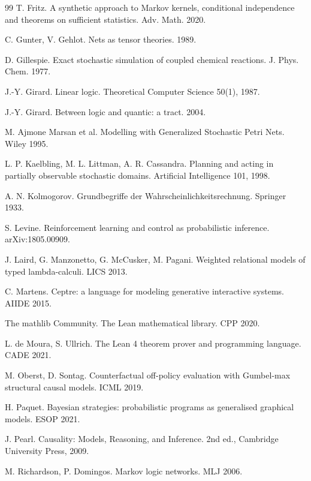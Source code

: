 \documentclass[11pt]{article}
\theoremstyle{plain}
\theoremstyle{definition}
\theoremstyle{remark}
\begin{document}
\begin{thebibliography}{99}
 T. Fritz. A synthetic approach to Markov
kernels, conditional independence and theorems on sufficient
statistics. Adv. Math. 2020.

 C. Gunter, V. Gehlot. Nets as tensor theories.
1989.

 D. Gillespie. Exact stochastic simulation of
coupled chemical reactions. J. Phys. Chem. 1977.

 J.-Y. Girard. Linear logic. Theoretical
Computer Science 50(1), 1987.

 J.-Y. Girard. Between logic and quantic: a
tract. 2004.

 M. Ajmone Marsan et al. Modelling with
Generalized Stochastic Petri Nets. Wiley 1995.

 L. P. Kaelbling, M. L. Littman, A. R.
Cassandra. Planning and acting in partially observable stochastic
domains. Artificial Intelligence 101, 1998.

 A. N. Kolmogorov. Grundbegriffe der
Wahrscheinlichkeitsrechnung. Springer 1933.

 S. Levine. Reinforcement learning and control
as probabilistic inference. arXiv:1805.00909.

 J. Laird, G. Manzonetto, G. McCusker, M.
Pagani. Weighted relational models of typed lambda-calculi. LICS 2013.

 C. Martens. Ceptre: a language for modeling
generative interactive systems. AIIDE 2015.

 The mathlib Community. The Lean
mathematical library. CPP 2020.

 L. de Moura, S. Ullrich. The Lean 4 theorem
prover and programming language. CADE 2021.

 M. Oberst, D. Sontag. Counterfactual off-policy
evaluation with Gumbel-max structural causal models. ICML 2019.

 H. Paquet. Bayesian strategies: probabilistic
programs as generalised graphical models. ESOP 2021.

 J. Pearl. Causality: Models, Reasoning, and
Inference. 2nd ed., Cambridge University Press, 2009.

 M. Richardson, P. Domingos. Markov logic
networks. MLJ 2006.


\end{thebibliography}
\end{document}
